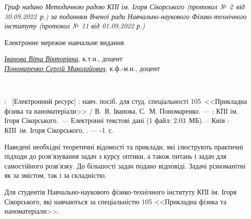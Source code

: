 {\begin{alwayssingle}
		\begin{center}\itshape\small
				Гриф надано Методичною радою КПІ ім. Ігоря Сікорського (протокол №~2~від 30.09.2022~р.) за поданням Вченої ради Навчально-наукового Фізико-технічного інституту (протокол №~11 від 01.09.2022 р.)
		\end{center}
		\begin{center}
			\ifelectronic Електронне мережне навчальне видання \fi
		\end{center}
		\begin{center}
			\href{https://apd.ipt.kpi.ua/blog/author/11}{\itshape Іванова Віта Вікторівна}, к.т.н., доцент \\
			\href{https://apd.ipt.kpi.ua/blog/author/183}{\itshape Пономаренко Сергій Миколайович}, к.ф.-м.н., доцент
		\end{center}
		\begin{center}\bfseries
			\LARGE\sffamily\realtitle \\
			\Large\sffamily\subtitletypeset
		\end{center}
        \begin{center}
            \editiontypeset
        \end{center}
        \noindent%
        \begin{minipage}[t]{\textwidth}\small
                \realtitle: \subtitletypeset\ [Електронний ресурс] : навч. посіб. для студ. спеціальності
                105 <<Прикладна фізика та наноматеріали>> /  В.~В. Іванова, С.~М. Пономаренко. --- \editiontypeset ; КПІ ім. Ігоря Сікорського.~--- Електронні текстові дані
            (1 файл: 2.03~МБ). – Київ : КПІ ім. Ігоря Сікорського, \the\year. --- \the\numexpr{}-1\relax~с.
        \end{minipage}


		\vfill


        Наведені необхідні теоретичні відомості та приклади, які ілюструють практичні підходи до розв'язування задач з курсу оптики, а також  питань і задач для самостійного розв’язку.  До більшості задач подано відповіді. Задачі різноманітні як за змістом, так і за складністю.

        Для студентів Навчально-наукового фізико-технічного інституту КПІ ім. Ігоря Сікорського, які навчаються за спеціальністю 105 <<Прикладна фізика та наноматеріали>>.


\end{alwayssingle}}
